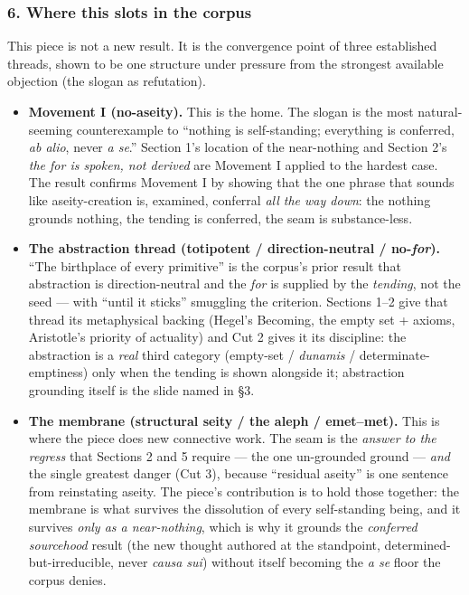 \documentclass[11pt]{article}
\begin{document}
\subsubsection*{6. Where this slots in the corpus}

This piece is not a new result. It is the convergence point of three established threads, shown to be one structure under pressure from the strongest available objection (the slogan as refutation).

\begin{itemize}
\item \textbf{Movement I (no-aseity).} This is the home. The slogan is the most natural-seeming counterexample to ``nothing is self-standing; everything is conferred, \emph{ab alio}, never \emph{a se}.'' Section 1's location of the near-nothing and Section 2's \emph{the for is spoken, not derived} are Movement I applied to the hardest case. The result confirms Movement I by showing that the one phrase that sounds like aseity-creation is, examined, conferral \emph{all the way down}: the nothing grounds nothing, the tending is conferred, the seam is substance-less.
\end{itemize}

\begin{itemize}
\item \textbf{The abstraction thread (totipotent /\allowbreak{} direction-neutral /\allowbreak{} no-\emph{for}).} ``The birthplace of every primitive'' is the corpus's prior result that abstraction is direction-neutral and the \emph{for} is supplied by the \emph{tending}, not the seed — with ``until it sticks'' smuggling the criterion. Sections 1–2 give that thread its metaphysical backing (Hegel's Becoming, the empty set + axioms, Aristotle's priority of actuality) and Cut 2 gives it its discipline: the abstraction is a \emph{real} third category (empty-set /\allowbreak{} \emph{dunamis} /\allowbreak{} determinate-emptiness) only when the tending is shown alongside it; abstraction grounding itself is the slide named in §3.
\end{itemize}

\begin{itemize}
\item \textbf{The membrane (structural seity /\allowbreak{} the aleph /\allowbreak{} emet–met).} This is where the piece does new connective work. The seam is the \emph{answer to the regress} that Sections 2 and 5 require — the one un-grounded ground — \emph{and} the single greatest danger (Cut 3), because ``residual aseity'' is one sentence from reinstating aseity. The piece's contribution is to hold those together: the membrane is what survives the dissolution of every self-standing being, and it survives \emph{only as a near-nothing}, which is why it grounds the \emph{conferred sourcehood} result (the new thought authored at the standpoint, determined-but-irreducible, never \emph{causa sui}) without itself becoming the \emph{a se} floor the corpus denies.
\end{itemize}
\end{document}
